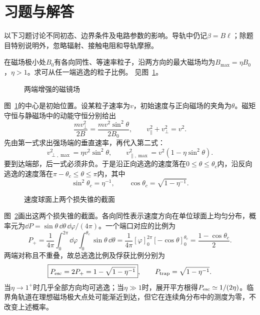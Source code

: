 
\section{习题与解答}\label{sec:i3-exercises}
以下习题讨论不同初态、边界条件及电路参数的影响。导轨中仍记$\beta=B\ell$；除题目特别说明外，忽略辐射、接触电阻和导轨摩擦。


\begin{exercise}[磁镜的损失锥]\label{ex:i3-h1}
在磁场极小处$B_0$有各向同性、等速率粒子，沿两方向的最大磁场均为$B_{\max}=\eta B_0$，$\eta>1$。求可从任一端逃逸的粒子比例。 见图~\ref{fig:i3-h1-q}。
\end{exercise}

\begin{figure}[H]\centering
{}
\caption{两端增强的磁镜场}\label{fig:i3-h1-q}
\end{figure}
\begin{solution}
图~\ref{fig:i3-h1-q}的中心是初始位置。设某粒子速率为$v$，初始速度与正向磁场的夹角为$\theta$。磁矩守恒与静磁场中的动能守恒分别给出
\[
\frac{mv_\perp^2}{2B}=\frac{mv^2\sin^2\theta}{2B_0},
\qquad v_\parallel^2+v_\perp^2=v^2.
\]
先由第一式求出强场端的垂直速率，再代入第二式：
\[
v_{\perp,\max}^2=\eta v^2\sin^2\theta,\qquad
v_{\parallel,\max}^2=v^2(1-\eta\sin^2\theta).
\]
要到达端部，后一式必须非负。于是沿正向逃逸的速度落在$0\le\theta\le\theta_c$内，沿反向逃逸的速度落在$\pi-\theta_c\le\theta\le\pi$内，其中
\[
\sin^2\theta_c=\eta^{-1},\qquad
\cos\theta_c=\sqrt{1-\eta^{-1}}.
\]
\begin{figure}[H]\centering
{}
\caption{速度球面上两个损失锥的截面}\label{fig:i3-h1-s}
\end{figure}
图~\ref{fig:i3-h1-s}画出这两个损失锥的截面。各向同性表示速度方向在单位球面上均匀分布，概率元为$\dd P=\sin\theta\,\dd\theta\,\dd\varphi/(4\pi)$。一个端口对应的比例为
\[
P_+=\frac1{4\pi}\int_0^{2\pi}\dd\varphi
\int_0^{\theta_c}\sin\theta\,\dd\theta
=\frac1{4\pi}[\varphi]_0^{2\pi}[-\cos\theta]_0^{\theta_c}
=\frac{1-\cos\theta_c}{2}.
\]
两端对称且不重叠，故总逃逸比例及俘获比例分别为
\[
\boxed{P_{\rm esc}=2P_+=1-\sqrt{1-\eta^{-1}}},
\qquad P_{\rm trap}=\sqrt{1-\eta^{-1}}.
\]
当$\eta\to1^+$时几乎全部方向均可逃逸；当$\eta\gg1$时，展开平方根得$P_{\rm esc}\simeq1/(2\eta)$。临界角轨道在理想磁场极大点处可能渐近到达，但它在连续角分布中的测度为零，不改变上述概率。
\end{solution}

